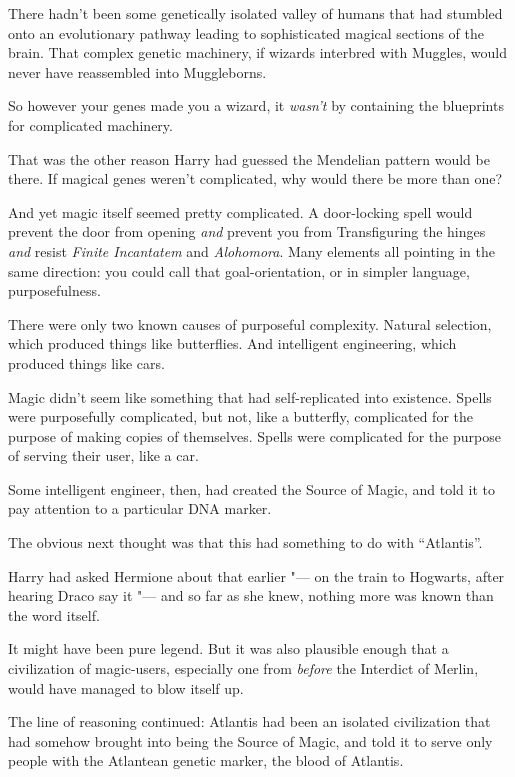 There hadn't been some genetically isolated valley of humans that had
stumbled onto an evolutionary pathway leading to sophisticated magical
sections of the brain. That complex genetic machinery, if wizards
interbred with Muggles, would never have reassembled into Muggleborns.

So however your genes made you a wizard, it \emph{wasn't} by containing
the blueprints for complicated machinery.

That was the other reason Harry had guessed the Mendelian pattern would
be there. If magical genes weren't complicated, why would there be more
than one?

And yet magic itself seemed pretty complicated. A door-locking spell
would prevent the door from opening \emph{and} prevent you from
Transfiguring the hinges \emph{and} resist \emph{Finite Incantatem} and
\emph{Alohomora}. Many elements all pointing in the same direction: you
could call that goal-orientation, or in simpler language,
purposefulness.

There were only two known causes of purposeful complexity. Natural
selection, which produced things like butterflies. And intelligent
engineering, which produced things like cars.

Magic didn't seem like something that had self-replicated into
existence. Spells were purposefully complicated, but not, like a
butterfly, complicated for the purpose of making copies of themselves.
Spells were complicated for the purpose of serving their user, like a
car.

Some intelligent engineer, then, had created the Source of Magic, and
told it to pay attention to a particular DNA marker.

The obvious next thought was that this had something to do with
``Atlantis''.

Harry had asked Hermione about that earlier "--- on the train to Hogwarts,
after hearing Draco say it "--- and so far as she knew, nothing more was
known than the word itself.

It might have been pure legend. But it was also plausible enough that a
civilization of magic-users, especially one from \emph{before} the
Interdict of Merlin, would have managed to blow itself up.

The line of reasoning continued: Atlantis had been an isolated
civilization that had somehow brought into being the Source of Magic,
and told it to serve only people with the Atlantean genetic marker, the
blood of Atlantis.

